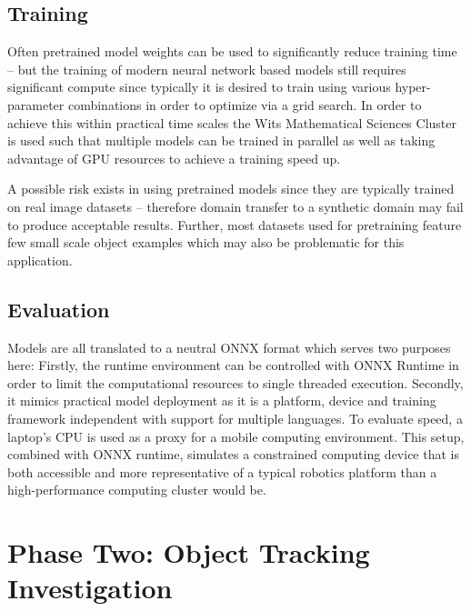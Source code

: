 \documentclass[a4paper,twoside,12pt]{report}
\begin{document}
\subsection{Training}

Often pretrained model weights can be used to significantly reduce training time -- but the training of modern neural network based models still requires significant compute since typically it is desired to train using various hyper-parameter combinations in order to optimize via a grid search. In order to achieve this within practical time scales the Wits Mathematical Sciences Cluster is used such that multiple models can be trained in parallel as well as taking advantage of GPU resources to achieve a training speed up.  

A possible risk exists in using pretrained models since they are typically trained on real image datasets -- therefore domain transfer to a synthetic domain may fail to produce acceptable results. Further, most datasets used for pretraining feature few small scale object examples which may also be problematic for this application.

\subsection{Evaluation}

Models are all translated to a neutral ONNX format which serves two purposes here: Firstly, the runtime environment can be controlled with ONNX Runtime in order to limit the computational resources to single threaded execution. Secondly, it mimics practical model deployment as it is a platform, device and training framework independent with support for multiple languages. To evaluate speed, a laptop's CPU is used as a proxy for a mobile computing environment. This setup, combined with ONNX runtime, simulates a constrained computing device that is both accessible and more representative of a typical robotics platform than a high-performance computing cluster would be.


\section{Phase Two: Object Tracking Investigation}
\end{document}
